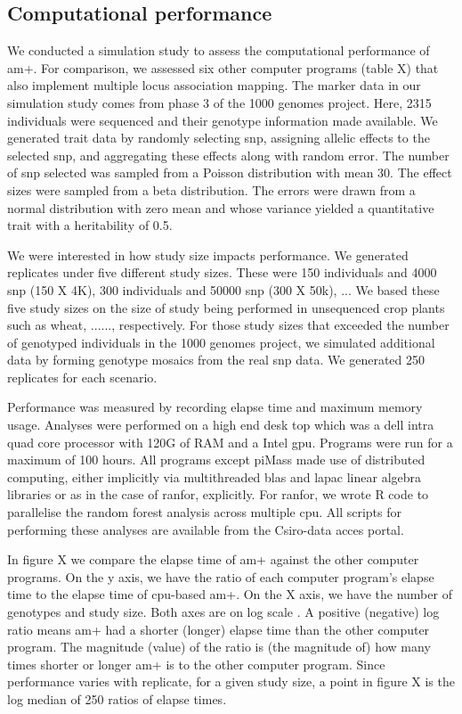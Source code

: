 \documentclass[12pt]{article}
\begin{document}
\subsection{Computational performance}
We conducted a simulation study to assess  the computational performance of am+. For comparison, we assessed six other computer programs (table X) that  also implement multiple locus association mapping. The marker data in our simulation study comes from phase 3 of the 1000 genomes project. Here, 2315 individuals were sequenced and their genotype information made available. We generated trait data by randomly selecting snp, assigning allelic  effects to the selected snp, and aggregating these effects along with random error. The number of snp  selected  was sampled from a Poisson distribution with mean 30. The effect sizes were sampled from a beta distribution. The errors were drawn from a normal distribution with zero mean and whose variance yielded a quantitative trait with a heritability of 0.5.


We were interested in how study size impacts performance. We generated replicates under five different study sizes. These were 150 individuals and 4000 snp (150 X 4K), 300 individuals and 50000 snp (300 X 50k), ... We based these five study sizes on the size of study being performed in unsequenced crop plants such as wheat, ......, respectively. For those study sizes that exceeded the number of genotyped individuals in the 1000 genomes project,  we simulated additional data by forming genotype mosaics from the real snp data. We generated 250 replicates for each scenario. 

Performance was measured by recording elapse  time and maximum memory usage. Analyses were performed on a high end desk top which was a dell intra quad core processor with 120G of RAM and a Intel gpu. Programs were run for a maximum of 100 hours.  All programs except piMass  made use of distributed computing, either implicitly via multithreaded blas and lapac linear algebra libraries or as in the case of ranfor, explicitly. For ranfor, we wrote R code to parallelise the random forest analysis across multiple cpu.  All scripts for performing these analyses are available from the Csiro-data acces portal.

In figure X we compare the elapse time of  am+ against the other computer programs. On the y axis, we have the ratio of each computer program's elapse time to the elapse time of cpu-based am+. On the X axis, we have the number of genotypes and study size. Both axes are on log scale . A positive (negative) log ratio means am+ had a shorter (longer) elapse time  than the other computer program. The magnitude (value) of the ratio is (the magnitude of)  how many times shorter or longer am+ is to the other computer program.  Since performance varies with replicate, for a given study size, a point in figure X is the log median of 250  ratios of elapse times.
\end{document}
